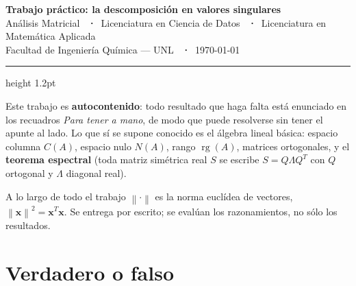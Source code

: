 \documentclass[11pt,a4paper]{article}
\newcommand{\bi}[1]{\boldsymbol{#1}}
\DeclareMathOperator{\rg}{rg}
\newcommand{\norm}[1]{\left\|#1\right\|}
\begin{document}
\begin{center}
  {\lato\bfseries\Large\color{fiqtexto} Trabajo práctico: la descomposición
   en valores singulares}\\[3pt]
  {\lato\small\color{fiqgris} Análisis Matricial \ \textbf{·}\ Licenciatura en
   Ciencia de Datos \ \textbf{·}\ Licenciatura en Matemática Aplicada}\\[1pt]
  {\lato\small\color{fiqgris} Facultad de Ingeniería Química --- UNL \
   \textbf{·}\ \today}
\end{center}
\vspace{0.4em}
{\color{fiqlinea}\hrule height 1.2pt}
\vspace{1.2em}

\noindent
Este trabajo es \textbf{autocontenido}: todo resultado que haga falta está
enunciado en los recuadros \emph{Para tener a mano}, de modo que puede
resolverse sin tener el apunte al lado. Lo que sí se supone conocido es el
álgebra lineal básica: espacio columna $C(A)$, espacio nulo $N(A)$, rango
$\rg(A)$, matrices ortogonales, y el \textbf{teorema espectral} (toda matriz
simétrica real $S$ se escribe $S=Q\Lambda Q^T$ con $Q$ ortogonal y $\Lambda$
diagonal real).

\medskip
\noindent
A lo largo de todo el trabajo $\norm{\cdot}$ es la norma euclídea de vectores,
$\norm{\bi x}^2=\bi x^T\bi x$. Se entrega por escrito; se evalúan los
razonamientos, no sólo los resultados.

\section{Verdadero o falso}
\end{document}
